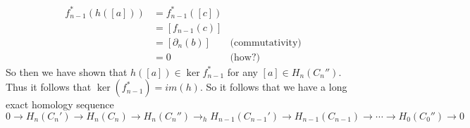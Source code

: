 \documentclass{article}
\theoremstyle{definition}
\begin{document}
    \begin{align*}
        f_{n-1}^*(h([a])) &= f_{n-1}^*([c]) \\
        &= [f_{n-1}(c)] \\
        &= [\partial_n(b)] & \text{(commutativity)}\\
        &= 0 & \text{(how?)}
    \end{align*}
    So then we have shown that $h([a]) \in \ker f_{n-1}^*$ for any $[a] \in H_{n}(C_n'')$.
    Thus it follows that $\ker(f_{n-1}^*) = im(h)$. So it follows that we have a long exact 
    homology sequence 
    \[
        0 \rightarrow H_n(C_n') \rightarrow H_n(C_n) \rightarrow H_n(C_n'') \rightarrow_h H_{n-1}(C_{n-1}') \rightarrow H_{n-1}(C_{n-1}) \rightarrow \cdots \rightarrow H_0(C_0'') \rightarrow 0
    \]
\end{document}
